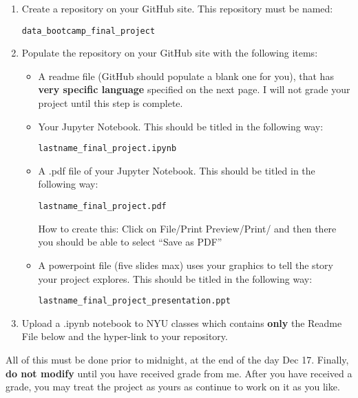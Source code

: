 \begin{enumerate}

\item Create a repository on your GitHub site. This repository must be named:

 {\tt data\_bootcamp\_final\_project}

 \bigskip

\item Populate the repository on your GitHub site with the following items:
\begin{itemize}

\item A readme file (GitHub should populate a blank one for you), that has \textbf{very specific language} specified on the next page. I will not grade your project until this step is complete.

\bigskip

\item Your Jupyter Notebook. This should be titled in the following way:

 {\tt lastname\_final\_project.ipynb}

\bigskip

\item A .pdf file of your Jupyter Notebook. This should be titled in the following way:

 {\tt lastname\_final\_project.pdf}

How to create this: Click on File/Print Preview/Print/ and then there you should be able to select ``Save as PDF''

\bigskip

\item A powerpoint file (five slides max) uses your graphics to tell the story your project explores. This should be titled in the following way:

{\tt lastname\_final\_project\_presentation.ppt}

\end{itemize}

\bigskip

\item Upload a .ipynb notebook to NYU classes which contains \textbf{only} the Readme File below and the hyper-link to your repository.

\end{enumerate}

All of this must be done prior to midnight, at the end of the day Dec 17. Finally, \textbf{do not modify} until you have received grade from me. After you have received a grade, you may treat the project as yours as continue to work on it as you like.

